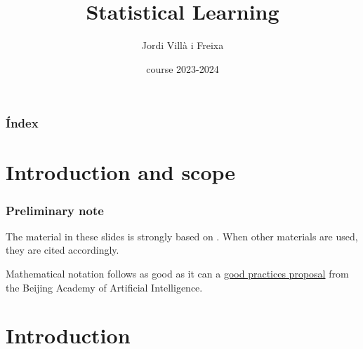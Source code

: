 \documentclass{beamer}
\title[Statistical Learning]{Statistical Learning} %
\author{Jordi Villà i Freixa} %
\institute[FCTE] %
{
Universitat de Vic - Universitat Central de Catalunya \\
Study Abroad\\ %
\medskip
\textit{jordi.villa@uvic.cat} %
}
\date{course 2023-2024}
\begin{document}
\begin{frame}
\titlepage %
\end{frame}

\begin{frame}
\frametitle{Índex} %
\tableofcontents %
\end{frame}

\section{Introduction and scope}
\begin{frame}
  \frametitle{Preliminary note}
  The material in these slides is strongly based on \cite{kroese2020}. When other materials are used, they are cited accordingly.

  Mathematical notation follows as good as it can a \href{https://ctan.math.utah.edu/ctan/tex-archive/macros/latex/contrib/mlmath/mlmath.pdf}{good practices proposal} from the Beijing Academy of Artificial Intelligence.
  \end{frame}

\section{Introduction} %

\end{document}
